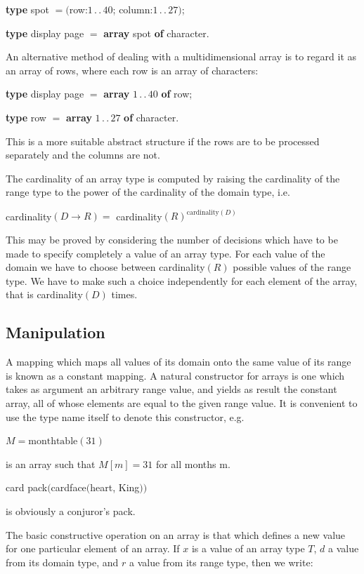 \documentclass[twoside,11pt]{book}
\begin{document}
\quad \textbf{type} spot $= ($row:$1\,.\,.\,40$; column:$1\,.\,.\,27)$;

\quad \textbf{type} display page $=$ \textbf{array} spot \textbf{of} character.

An alternative method of dealing with a multidimensional array is to regard it as an array of rows, where each row is an array of characters:

\quad \textbf{type} display page $=$ \textbf{array} $1\,.\,.\,40$ \textbf{of} row;

\quad \textbf{type} row $=$ \textbf{array} $1\,.\,.\,27$ \textbf{of} character.

\noindent
This is a more suitable abstract structure if the rows are to be processed separately and the columns are not.

The cardinality of an array type is computed by raising the cardinality of the range type to the power of the cardinality of the domain type, i.e.

\quad cardinality$(D \rightarrow R) =$ cardinality$(R)^{\text{cardinality}(D)}$

\noindent
This may be proved by considering the number of decisions which have to be made to specify completely a value of an array type. For each value of the domain we have to choose between cardinality$(R)$ possible values of the range type. We have to make such a choice independently for each element of the array, that is cardinality$(D)$ times.

\subsection{Manipulation}

A mapping which maps all values of its domain onto the same value of its range is known as a constant mapping. A natural constructor for arrays is one which takes as argument an arbitrary range value, and yields as result the constant array, all of whose elements are equal to the given range value. It is convenient to use the type name itself to denote this constructor, e.g.

\quad $M = \text{monthtable}(31)$

\noindent
is an array such that $M[m] = 31$ for all months m.

\quad card pack$($cardface$($heart, King$))$

\noindent
is obviously a conjuror's pack.

The basic constructive operation on an array is that which defines a new value for one particular element of an array. If $x$ is a value of an array type $T$, $d$ a value from its domain type, and $r$ a value from its range type, then we write:
\end{document}
